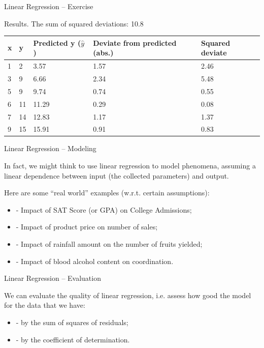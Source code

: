 \documentclass{beamer}
\begin{document}

\begin{frame}
{\centerline{Linear Regression -- Exercise}}

Results. The sum of squared deviations: 10.8
\small
\begin{table}[]
\centering
\begin{tabular}{l | l | l | l| l} 
\toprule
x & y & Predicted y ($\hat{y}$) & Deviate from predicted (abs.) & Squared deviate \\
\midrule

1 & 2 & 3.57 & 1.57 & 2.46 \\
3 & 9 & 6.66 & 2.34 & 5.48 \\
5 & 9 & 9.74 & 0.74 & 0.55 \\
6 & 11 & 11.29 & 0.29 & 0.08 \\
7 & 14 & 12.83 & 1.17 & 1.37 \\
9 & 15 & 15.91 & 0.91 & 0.83 \\

\bottomrule

\end{tabular}
\end{table}
\end{frame}


\begin{frame}
{\centerline{Linear Regression -- Modeling}}
In fact, we might think to use linear regression to model phenomena, assuming a linear dependence between input (the collected parameters) and output. 

Here are some “real world” examples (w.r.t. certain assumptions):

\begin{itemize}
\item - Impact of SAT Score (or GPA) on College Admissions;
\item - Impact of product price on number of sales;
\item - Impact of rainfall amount on the number of fruits yielded;
\item - Impact of blood alcohol content on coordination.
\end{itemize}

\end{frame}

\begin{frame}
{\centerline{Linear Regression -- Evaluation}}
We can evaluate the quality of linear regression, i.e. assess how good the model for the data that we have:

\begin{itemize}
\item - by the sum of squares of residuals;
\item - by the coefficient of determination.
\end{itemize}



\end{frame}
\end{document}
